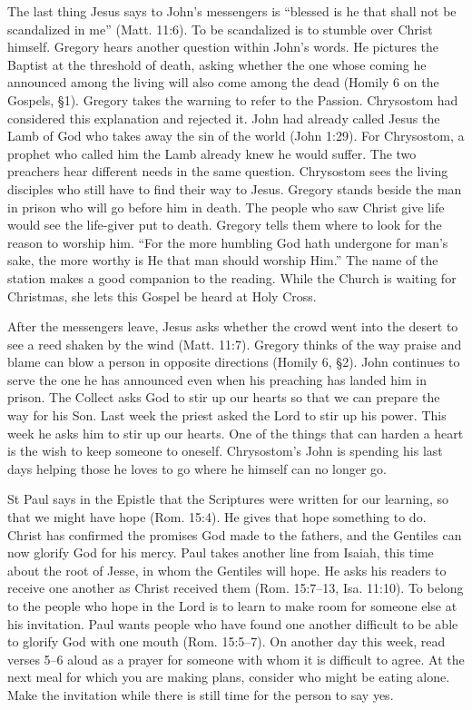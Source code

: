 The last thing Jesus says to John's messengers is “blessed is he that shall
not be scandalized in me” (Matt. 11:6). To be scandalized is to stumble over
Christ himself. Gregory hears another question within John's words. He
pictures the Baptist at the threshold of death, asking whether the one
whose coming he announced among the living will also come among the dead
(Homily 6 on the Gospels, §1). Gregory takes the warning to refer to the
Passion. Chrysostom had considered this explanation and rejected it.
John had already called Jesus the Lamb of God who takes away the sin of
the world (John 1:29). For Chrysostom, a prophet who called him the Lamb
already knew he would suffer. The two preachers hear different needs in
the same question. Chrysostom sees the living disciples who still have
to find their way to Jesus. Gregory stands beside the man in prison
who will go before him in death. The people who saw Christ give life would see the life-giver put
to death. Gregory tells them where to look for the reason to worship him.
“For the more humbling God hath undergone for man's sake, the more worthy
is He that man should worship Him.” The name of the station makes a good
companion to the reading. While the Church is waiting for Christmas, she
lets this Gospel be heard at Holy Cross.

After the messengers leave, Jesus asks whether the crowd went into the
desert to see a reed shaken by the wind (Matt. 11:7). Gregory thinks of
the way praise and blame can blow a person in opposite directions (Homily
6, §2). John continues to serve the one he has announced even when his
preaching has landed him in prison. The Collect asks God to stir up our
hearts so that we can prepare the way for his Son. Last week the priest
asked the Lord to stir up his power. This week he asks him to stir up
our hearts. One of the things that can harden a heart is the wish to
keep someone to oneself. Chrysostom's John is spending his last days
helping those he loves to go where he himself can no longer go.

St Paul says in the Epistle that the Scriptures were written for our
learning, so that we might have hope (Rom. 15:4). He gives that hope
something to do. Christ has confirmed the promises God made to the fathers,
and the Gentiles can now glorify God for his mercy. Paul takes another line
from Isaiah, this time about the root of Jesse, in whom the Gentiles will
hope. He asks his readers to receive one another as Christ received them
(Rom. 15:7--13, Isa. 11:10). To belong to the people who hope in the Lord
is to learn to make room for someone else at his invitation. Paul wants
people who have found one another difficult to be able to glorify God
with one mouth (Rom. 15:5--7). On another day this week, read verses
5--6 aloud as a prayer for someone with whom it is difficult to agree.
At the next meal for which you are making plans, consider who might be eating alone. Make the invitation while
there is still time for the person to say yes.

